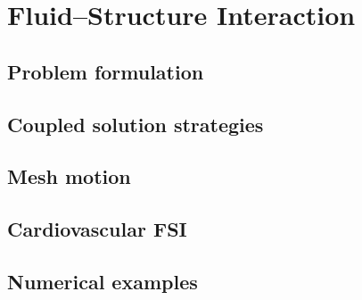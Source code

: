 \chapter{Fluid--Structure Interaction}
\label{ch:fsi}

\section{Problem formulation}
\label{sec:fsi:formulation}


\section{Coupled solution strategies}
\label{sec:fsi:coupling}


\section{Mesh motion}
\label{sec:fsi:mesh}


\section{Cardiovascular FSI}
\label{sec:fsi:cardio}


\section{Numerical examples}
\label{sec:fsi:examples}
